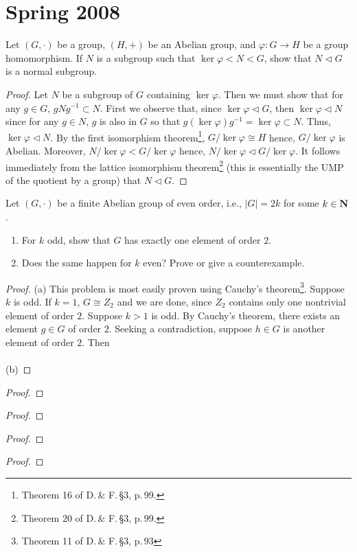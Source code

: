 \chapter{Spring 2008}
\begin{problem}
Let $(G,\cdot)$ be a group, $(H,+)$ be an Abelian group, and
$\varphi\colon G\to H$ be a group homomorphism. If $N$ is a subgroup such
that $\ker\varphi<N<G$, show that $N\lhd G$ is a normal subgroup.
\end{problem}
\begin{proof}
Let $N$ be a subgroup of $G$ containing $\ker\varphi$. Then we must show
that for any $g\in G$, $gNg^{-1}\subset N$. First we observe that, since
$\ker\varphi\lhd G$, then $\ker\varphi\lhd N$ since for any $g\in N$, $g$
is also in $G$ so that $g(\ker\varphi)g^{-1}=\ker\varphi\subset N$. Thus,
$\ker\varphi\lhd N$. By the first isomorphism theorem\footnote{Theorem 16
  of D.\,\& F.\,\S3, p.\,99.}, $G/\ker\varphi\cong H$ hence,
$G/\ker\varphi$ is Abelian. Moreover, $N/\ker\varphi<G/\ker\varphi$ hence,
$N/\ker\varphi\lhd G/\ker\varphi$. It follows immediately from the lattice
isomorphism theorem\footnote{Theorem 20 of D.\,\& F.\,\S3, p.\,99.} (this
is essentially the UMP of the quotient by a group) that $N\lhd G$.
\end{proof}
\begin{problem}
Let $(G,\cdot)$ be a finite Abelian group of even order, i.e., $|G|=2k$ for
some $k\in\mathbf{N}$.
\begin{enumerate}[noitemsep,label=(\alph*)]
\item For $k$ odd, show that $G$ has exactly one element of order $2$.
\item Does the same happen for $k$ even? Prove or give a counterexample.
\end{enumerate}
\end{problem}
\begin{proof}
(a) This problem is most easily proven using Cauchy's
theorem\footnote{Theorem 11 of D.\,\& F.\,\S3, p.\,93}. Suppose $k$ is
odd. If $k=1$, $G\cong Z_2$ and we are done, since $Z_2$ contains only one
nontrivial element of order $2$. Suppose $k>1$ is odd. By Cauchy's theorem,
there exists an element $g\in G$ of order $2$. Seeking a contradiction,
suppose $h\in G$ is another element of order $2$. Then
\\\\
(b)
\end{proof}
\begin{problem}
\end{problem}
\begin{proof}
\end{proof}
\begin{problem}
\end{problem}
\begin{proof}
\end{proof}
\begin{problem}
\end{problem}
\begin{proof}
\end{proof}
\begin{problem}
\end{problem}
\begin{proof}
\end{proof}
